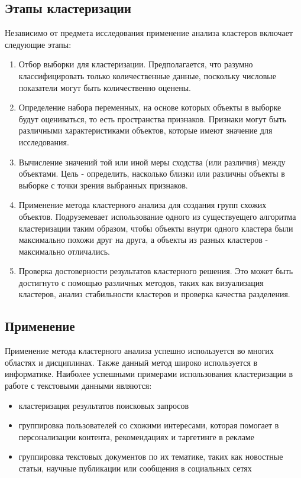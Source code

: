 		\subsection{Этапы кластеризации}
			Независимо от предмета исследования применение анализа кластеров включает следующие этапы:
			\begin{enumerate}
				\item Отбор выборки для кластеризации. Предполагается, что разумно классифицировать только количественные данные, поскольку числовые показатели могут быть количественно оценены.
				\item Определение набора переменных, на основе которых объекты в выборке будут оцениваться, то есть пространства признаков. Признаки могут быть различными характеристиками объектов, которые имеют значение для исследования.
				\item Вычисление значений той или иной меры сходства (или различия) между объектами. Цель - определить, насколько близки или различны объекты в выборке с точки зрения выбранных признаков.
				\item Применение метода кластерного анализа для создания групп схожих объектов. Подруземевает использование одного из существуещего алгоритма кластеризации таким образом, чтобы объекты внутри одного кластера были максимально похожи друг на друга, а объекты из разных кластеров - максимально отличались.
				\item Проверка достоверности результатов кластерного решения. Это может быть достигнуто с помощью различных методов, таких как визуализация кластеров, анализ стабильности кластеров и проверка качества разделения.
			\end{enumerate}

	\subsection{Применение}
			Применение метода кластерного анализа успешно используется во многих областях и дисциплинах. Также данный метод широко используется в информатике. Наиболее успешными примерами использования кластеризации в работе с текстовыми данными являются: 
			\begin{itemize}
				\item кластеризация результатов поисковых запросов
				\item группировка пользователей со схожими интересами, которая помогает в персонализации контента, рекомендациях и таргетинге в рекламе
				\item группировка текстовых документов по их тематике, таких как новостные статьи, научные публикации или сообщения в социальных сетях
			\end{itemize}

